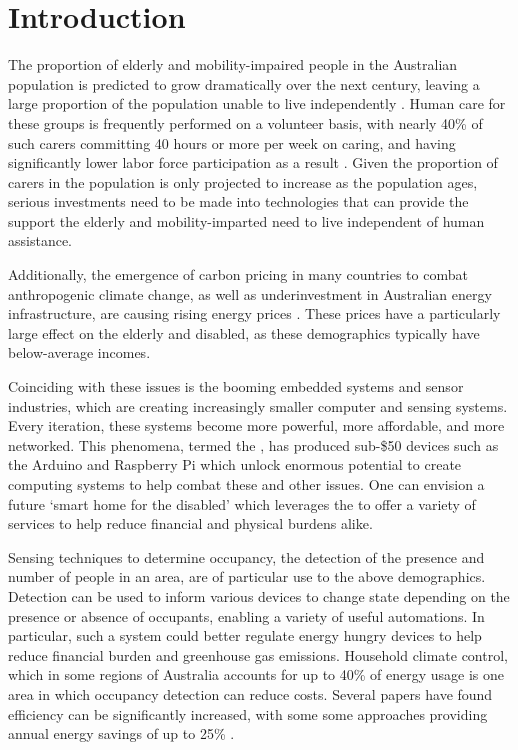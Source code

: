 \documentclass[../thesis/thesis.tex]{subfiles}
\begin{document}
\chapter{Introduction}
The proportion of elderly and mobility-impaired people in the Australian population is predicted to grow dramatically over the next century, leaving a large proportion of the population unable to live independently \cite{chan2009smart}. Human care for these groups is frequently performed on a volunteer basis, with nearly 40\% of such carers committing 40 hours or more per week on caring, and having significantly lower labor force participation as a result \cite{abs4430}. Given the proportion of carers in the population is only projected to increase as the population ages, serious investments need to be made into technologies that can provide the support the elderly and mobility-imparted need to live independent of human assistance.

Additionally, the emergence of carbon pricing in many countries to combat anthropogenic climate change, as well as underinvestment in Australian energy infrastructure, are causing rising energy prices \cite{energyprices}. These prices have a particularly large effect on the elderly and disabled, as these demographics typically have below-average incomes.

Coinciding with these issues is the booming embedded systems and sensor industries, which are creating increasingly smaller computer and sensing systems. Every iteration, these systems become more powerful, more affordable, and more networked. This phenomena, termed the \iot, has produced sub-\$50 devices such as the Arduino and Raspberry Pi which unlock enormous potential to create computing systems to help combat these and other issues. One can envision a future `smart home for the disabled' which leverages the \iot to offer a variety of services to help reduce financial and physical burdens alike.

Sensing techniques to determine occupancy, the detection of the presence and number of people in an area, are of particular use to the above demographics. Detection can be used to inform various devices to change state depending on the presence or absence of occupants, enabling a variety of useful automations. In particular, such a system could better regulate energy hungry devices to help reduce financial burden and greenhouse gas emissions. Household climate control, which in some regions of Australia accounts for up to 40\% of energy usage \cite{abs4602} is one area in which occupancy detection can reduce costs. Several papers have found efficiency can be significantly increased, with some some approaches providing annual energy savings of up to 25\% \cite{beltran2013thermosense}.
 
\end{document}
